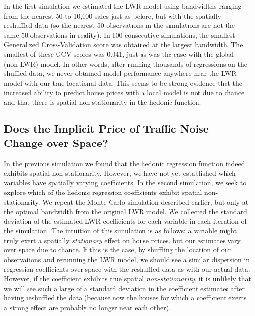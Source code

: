 \documentclass{article}\usepackage[]{graphicx}\usepackage[]{color}
\begin{document}
In the first simulation we estimated the LWR model using bandwidths ranging from the nearest 50 to 10,000 sales just as before, but with the spatially reshuffled data (so the nearest 50 observations in the simulations are not the same 50 observations in reality). In 100 consecutive simulations, the smallest Generalized Cross-Validation score was obtained at the largest bandwidth. The smallest of these GCV scores was 0.041, just as was the case with the global (non-LWR) model. In other words, after running thousands of regressions on the shuffled data, we never obtained model performance anywhere near the LWR model with our true locational data. This seems to be strong evidence that the increased ability to predict house prices with a local model is not due to chance and that there is spatial non-stationarity in the hedonic function.

\subsection{Does the Implicit Price of Traffic Noise Change over Space?}
In the previous simulation we found that the hedonic regression function indeed exhibits spatial non-stationarity. However, we have not yet established which variables have spatially varying coefficients. In the second simulation, we seek to explore which of the hedonic regression coefficients exhibit spatial non-stationarity. We repeat the Monte Carlo simulation described earlier, but only at the optimal bandwidth from the original LWR model. We collected the standard deviation of the estimated LWR coefficients for each variable in each iteration of the simulation. The intuition of this simulation is as follows: a variable might truly exert a spatially \emph{stationary} effect on house prices, but our estimates vary over space due to chance. If this is the case, by shuffling the location of our observations and rerunning the LWR model, we should see a similar dispersion in regression coefficients over space with the reshuffled data as with our actual data. However, if the coefficient exhibits true spatial \emph{non-stationarity}, it is unlikely that we will see such a large of a standard deviation in the coefficient estimates after having reshuffled the data (because now the houses for which a coefficient exerts a strong effect are probably no longer near each other). 
\end{document}
